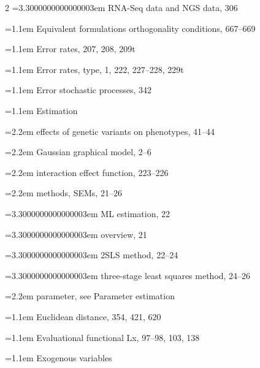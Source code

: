 \begin{multicols}{2}
\noindent\hangindent=3.3000000000000003em \hspace*{2.2em}RNA-Seq data and NGS data, 306\par
\noindent\hangindent=1.1em Equivalent formulations orthogonality conditions, 667--669\par
\noindent\hangindent=1.1em Error rates, 207, 208, 209t\par
\noindent\hangindent=1.1em Error rates, type, 1, 222, 227--228, 229t\par
\noindent\hangindent=1.1em Error stochastic processes, 342\par
\noindent\hangindent=1.1em Estimation\par
\noindent\hangindent=2.2em \hspace*{1.1em}effects of genetic variants on phenotypes, 41--44\par
\noindent\hangindent=2.2em \hspace*{1.1em}Gaussian graphical model, 2--6\par
\noindent\hangindent=2.2em \hspace*{1.1em}interaction effect function, 223--226\par
\noindent\hangindent=2.2em \hspace*{1.1em}methods, SEMs, 21--26\par
\noindent\hangindent=3.3000000000000003em \hspace*{2.2em}ML estimation, 22\par
\noindent\hangindent=3.3000000000000003em \hspace*{2.2em}overview, 21\par
\noindent\hangindent=3.3000000000000003em \hspace*{2.2em}2SLS method, 22--24\par
\noindent\hangindent=3.3000000000000003em \hspace*{2.2em}three-stage least squares method, 24--26\par
\noindent\hangindent=2.2em \hspace*{1.1em}parameter, see Parameter estimation\par
\noindent\hangindent=1.1em Euclidean distance, 354, 421, 620\par
\noindent\hangindent=1.1em Evaluational functional Lx, 97--98, 103, 138\par
\noindent\hangindent=1.1em Exogenous variables\par

\end{multicols}
